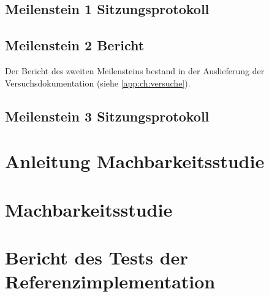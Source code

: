 \section{Meilenstein 1 Sitzungsprotokoll}


\section{Meilenstein 2 Bericht}
Der Bericht des zweiten Meilensteins bestand in der Auslieferung der Versuchsdokumentation (siehe \ref{app:ch:versuche}).

\section{Meilenstein 3 Sitzungsprotokoll}
\label{app:sec:protokollMeilenstein3}


\newpage
\chapter{Anleitung Machbarkeitsstudie}
\label{app:ch:AnleitungMachbarkeitsstudie}


\newpage
\chapter{Machbarkeitsstudie}
\label{app:ch:Machbarkeitsstudie}


\newpage
\chapter{Bericht des Tests der Referenzimplementation}
\label{app:ch:BerichtRefImpl}

